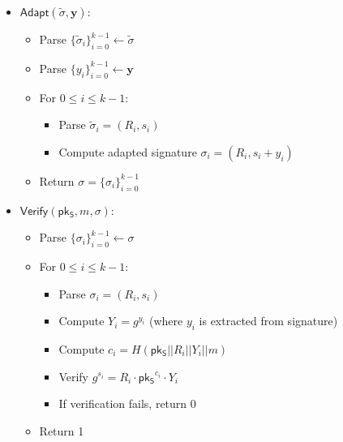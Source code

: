 \begin{itemize}
\item $\mathsf{Adapt}(\widetilde{\sigma}, \mathbf{y})$:
   \begin{itemize}
       \item Parse $\{\widetilde{\sigma}_i\}_{i=0}^{k-1} \leftarrow \widetilde{\sigma}$
       \item Parse $\{y_i\}_{i=0}^{k-1} \leftarrow \mathbf{y}$
       \item For $0\leq i\leq k-1$:
       \begin{itemize}
           \item Parse $\widetilde{\sigma}_i = (R_i,s_i)$
           \item Compute adapted signature $\sigma_i = (R_i, s_i + y_i)$
       \end{itemize}
       \item Return $\sigma = \{\sigma_i\}_{i=0}^{k-1}$
   \end{itemize}

\item $\mathsf{Verify}(\mathsf{pk_S}, m, \sigma)$:
   \begin{itemize}
       \item Parse $\{\sigma_i\}_{i=0}^{k-1} \leftarrow \sigma$
       \item For $0\leq i\leq k-1$:
       \begin{itemize}
           \item Parse $\sigma_i = (R_i,s_i)$
           \item Compute $Y_i = g^{y_i}$ (where $y_i$ is extracted from signature)
           \item Compute $c_i = H(\mathsf{pk_S}||R_i|| Y_i||m)$
           \item Verify $g^{s_i} = R_i \cdot \mathsf{pk_S}^{c_i} \cdot Y_i$
           \item If verification fails, return 0
       \end{itemize}
       \item Return 1
   \end{itemize}


\end{itemize}
